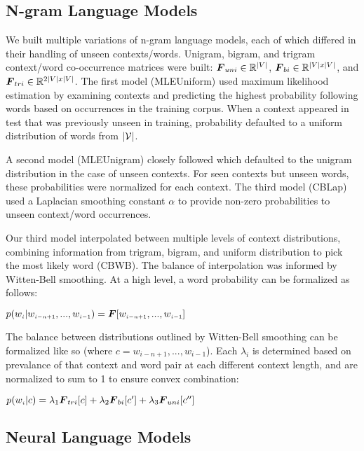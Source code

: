 \documentclass[11pt]{article}
\begin{document}
\subsection{N-gram Language Models}

We built multiple variations of n-gram language models, each of which differed in their handling of unseen contexts/words. Unigram, bigram, and trigram context/word co-occurrence matrices were built: $\boldsymbol{F}_{uni} \in \mathbb{R}^{|V|}$, $\boldsymbol{F}_{bi} \in \mathbb{R}^{|V| x |V|}$, and $\boldsymbol{F}_{tri} \in \mathbb{R}^{2|V| x |V|}$. The first model (MLEUniform) used maximum likelihood estimation by examining contexts and predicting the highest probability following words based on occurrences in the training corpus. When a context appeared in test that was previously unseen in training, probability defaulted to a uniform distribution of words from $|\mathcal{V}|$.

A second model (MLEUnigram) closely followed which defaulted to the unigram distribution in the case of unseen contexts. For seen contexts but unseen words, these probabilities were normalized for each context. The third model (CBLap) used a Laplacian smoothing constant $\alpha$ to provide non-zero probabilities to unseen context/word occurrences.

Our third model interpolated between multiple levels of context distributions, combining information from trigram, bigram, and uniform distribution to pick the most likely word (CBWB). The balance of interpolation was informed by Witten-Bell smoothing. At a high level, a word probability can be formalized as follows:
\begin{center}
    $p(w_{\scriptscriptstyle i}|w_{\scriptscriptstyle i-n+1},...,w_{\scriptscriptstyle i-1}) = \boldsymbol{F}[w_{\scriptscriptstyle i-n+1},...,w_{\scriptscriptstyle i-1}]$
\end{center}

The balance between distributions outlined by Witten-Bell smoothing can be formalized like so (where $c = w_{\scriptscriptstyle i-n+1},...,w_{\scriptscriptstyle i-1}$). Each $\lambda_{i}$ is determined based on prevalance of that context and word pair at each different context length, and are normalized to sum to 1 to ensure convex combination:
\begin{center}
$p(w_{\scriptscriptstyle i}|c) = \lambda_{1}\boldsymbol{F}_{tri}[c] + \lambda_{2}\boldsymbol{F}_{bi}[c'] + \lambda_{3}\boldsymbol{F}_{uni}[c'']$
\end{center}

\subsection{Neural Language Models}
\end{document}
